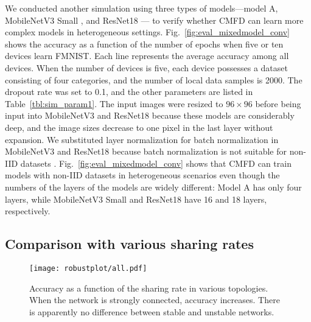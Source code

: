 \documentclass[journal]{IEEEtran}
\begin{document}
We conducted another simulation using three types of models---model A, MobileNetV3 Small \cite{howard2019searching}, and ResNet18 \cite{he2016deep}---%
to verify whether \gls{CMFD} can learn more complex models in heterogeneous settings.
Fig.~\ref{fig:eval_mixedmodel_conv} shows the accuracy as a function of the number of epochs when five or ten devices learn \gls{FMNIST}.
Each line represents the average accuracy among all devices.
When the number of devices is five, each device possesses a dataset consisting of four categories,
and the number of local data samples is 2000.
The dropout rate was set to 0.1, and the other parameters are listed in Table~\ref{tbl:sim_param1}.
The input images were resized to $96\times 96$ before being input into MobileNetV3 and ResNet18
because these models are considerably deep, and the image sizes decrease to one pixel in the last layer without expansion.
We substituted layer normalization \cite{ba2016layer} for batch normalization \cite{ioffe2015batch} in MobileNetV3 and ResNet18
because batch normalization is not suitable for non-\gls{IID} datasets \cite{niwa2020edge}.
Fig.~\ref{fig:eval_mixedmodel_conv} shows that \gls{CMFD} can train models with non-\gls{IID} datasets in heterogeneous scenarios
even though the numbers of the layers of the models are widely different:
Model A has only four layers, while MobileNetV3 Small and ResNet18 have 16 and 18 layers, respectively.

\subsection{Comparison with various sharing rates}
\begin{figure}[!t]
\centering
\texttt{[image: robustplot/all.pdf]}
\caption{Accuracy as a function of the sharing rate in various topologies.
When the network is strongly connected, accuracy increases.
There is apparently no difference between stable and unstable networks.
}
\label{fig:eval_sr2acc}
\end{figure}
\end{document}
